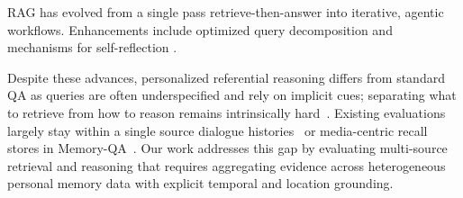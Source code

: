\documentclass{article}
\theoremstyle{plain}
\theoremstyle{definition}
\theoremstyle{remark}
\begin{document}
RAG has evolved from a single pass retrieve-then-answer \citep{izacard2022atlas} into iterative, agentic workflows. Enhancements include optimized query decomposition \citep{press2023measuring, jain2025simpledoc} and mechanisms for self-reflection \citep{asai2024selfrag, shao2024storm}. %

Despite these advances, personalized referential reasoning differs from standard QA as queries are often underspecified and rely on implicit cues; separating what to retrieve from how to reason remains intrinsically hard~\citep{jin2025disentangling}. 
Existing evaluations largely stay within a single source dialogue histories~\citep{maharana2024locomo,wu2025longmemeval} or media-centric recall stores in Memory-QA~\citep{jiang2025memoryqa}. 
Our work addresses this gap by evaluating multi-source retrieval and reasoning that requires aggregating evidence across heterogeneous personal memory data with explicit temporal and location grounding.
\end{document}
